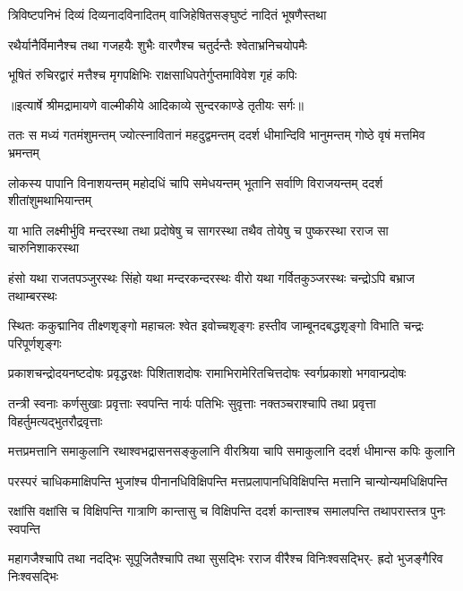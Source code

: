 \twolineshloka
{त्रिविष्टपनिभं दिव्यं दिव्यनादविनादितम्}
{वाजिहेषितसङ्घुष्टं नादितं भूषणैस्तथा} %

\twolineshloka
{रथैर्यानैर्विमानैश्च तथा गजहयैः शुभैः}
{वारणैश्च चतुर्दन्तैः श्वेताभ्रनिचयोपमैः} %

\twolineshloka
{भूषितं रुचिरद्वारं मत्तैश्च मृगपक्षिभिः}
{राक्षसाधिपतेर्गुप्तमाविवेश गृहं कपिः} %


{॥इत्यार्षे श्रीमद्रामायणे वाल्मीकीये आदिकाव्ये सुन्दरकाण्डे तृतीयः सर्गः॥}


\fourlineindentedshloka
{ततः स मध्यं गतमंशुमन्तम्}
{ज्योत्स्नावितानं महदुद्वमन्तम्}
{ददर्श धीमान्दिवि भानुमन्तम्}
{गोष्ठे वृषं मत्तमिव भ्रमन्तम्} %

\fourlineindentedshloka
{लोकस्य पापानि विनाशयन्तम्}
{महोदधिं चापि समेधयन्तम्}
{भूतानि सर्वाणि विराजयन्तम्}
{ददर्श शीतांशुमथाभियान्तम्} %

\fourlineindentedshloka
{या भाति लक्ष्मीर्भुवि मन्दरस्था}
{तथा प्रदोषेषु च सागरस्था}
{तथैव तोयेषु च पुष्करस्था}
{रराज सा चारुनिशाकरस्था} %

\fourlineindentedshloka
{हंसो यथा राजतपञ्जुरस्थः}
{सिंहो यथा मन्दरकन्दरस्थः}
{वीरो यथा गर्वितकुञ्जरस्थः}
{चन्द्रोऽपि बभ्राज तथाम्बरस्थः} %

\fourlineindentedshloka
{स्थितः ककुद्मानिव तीक्ष्णशृङ्गो}
{महाचलः श्वेत इवोच्चशृङ्गः}
{हस्तीव जाम्बूनदबद्धशृङ्गो}
{विभाति चन्द्रः परिपूर्णशृङ्गः} %

\fourlineindentedshloka
{प्रकाशचन्द्रोदयनष्टदोषः}
{प्रवृद्धरक्षः पिशिताशदोषः}
{रामाभिरामेरितचित्तदोषः}
{स्वर्गप्रकाशो भगवान्प्रदोषः} %

\fourlineindentedshloka
{तन्त्री स्वनाः कर्णसुखाः प्रवृत्ताः}
{स्वपन्ति नार्यः पतिभिः सुवृत्ताः}
{नक्तञ्चराश्चापि तथा प्रवृत्ता}
{विहर्तुमत्यद्भुतरौद्रवृत्ताः} %

\fourlineindentedshloka
{मत्तप्रमत्तानि समाकुलानि}
{रथाश्वभद्रासनसङ्कुलानि}
{वीरश्रिया चापि समाकुलानि}
{ददर्श धीमान्स कपिः कुलानि} %

\fourlineindentedshloka
{परस्परं चाधिकमाक्षिपन्ति}
{भुजांश्च पीनानधिविक्षिपन्ति}
{मत्तप्रलापानधिविक्षिपन्ति}
{मत्तानि चान्योन्यमधिक्षिपन्ति} %

\fourlineindentedshloka
{रक्षांसि वक्षांसि च विक्षिपन्ति}
{गात्राणि कान्तासु च विक्षिपन्ति}
{ददर्श कान्ताश्च समालपन्ति}
{तथापरास्तत्र पुनः स्वपन्ति} %

\fourlineindentedshloka
{महागजैश्चापि तथा नदद्भिः}
{सूपूजितैश्चापि तथा सुसद्भिः}
{रराज वीरैश्च विनिःश्वसद्भिर्-}
{ह्रदो भुजङ्गैरिव निःश्वसद्भिः} %

